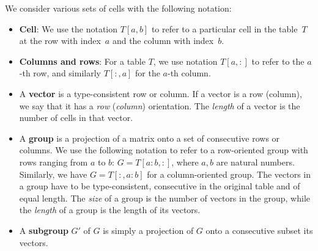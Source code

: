 \documentclass{ecai}
\newcommand{\groups}{\ensuremath{\mathcal{G}}\xspace}
\begin{document}
We consider various sets of cells with the following notation:
\begin{itemize}
  \item {\bf Cell}: We use the notation $T[a,b]$ to refer to a particular cell in the table~$T$ at the row with index~$a$ and the column with index~$b$.

  \item {\bf Columns and rows}: For a table $T$, we use notation $T[a,{:}]$ to refer to the $a$-th row, and similarly $T[{:},a]$ for the $a$-th column. %

  \item
  A \textbf{vector} is a type-consistent row or column.
  If a vector is a row (column), we say that it has a \textit{row} (\textit{column}) orientation. The \textit{length} of a vector is the number of cells in that vector.

  \item
  A \textbf{group} is a projection of a matrix onto a set of consecutive rows or columns. %
  We use the following notation to refer to a row-oriented group with rows ranging from $a$ to $b$: $G = T[a{:}b,:]$, where $a,b$ are natural numbers. Similarly, we have $G = T[{:},a{:}b]$ for a column-oriented group.
  The vectors in a group have to be type-consistent, consecutive in the original table and of equal length.
  The \textit{size} of a group is the number of vectors in the group, while the \textit{length} of a group is the length of its vectors. 

  \item
  A \textbf{subgroup} $G'$ of $G$ is simply a projection of $G$ onto a consecutive subset its vectors. %
\end{itemize}
\end{document}
